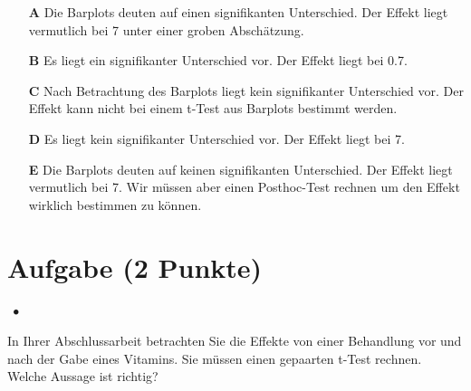 \documentclass[a4paper, 9pt]{scrartcl}\usepackage[]{graphicx}\usepackage[]{xcolor}
\begin{document}
\begin{enumerate}
\item [\textbf{A} \msquare] Die Barplots deuten auf einen signifikanten Unterschied. Der Effekt liegt vermutlich bei 7 unter einer groben Abschätzung.
\item [\textbf{B} \msquare] Es liegt ein signifikanter Unterschied vor. Der Effekt liegt bei 0.7.
\item [\textbf{C} \msquare] Nach Betrachtung des Barplots liegt kein signifikanter Unterschied vor. Der Effekt kann nicht bei einem t-Test aus Barplots bestimmt werden.
\item [\textbf{D} \msquare] Es liegt kein signifikanter Unterschied vor. Der Effekt liegt bei 7.
\item [\textbf{E} \msquare] Die Barplots deuten auf keinen signifikanten Unterschied. Der Effekt liegt vermutlich bei 7. Wir müssen aber einen Posthoc-Test rechnen um den Effekt wirklich bestimmen zu können.
\end{enumerate}

\section{Aufgabe \hfill (2 Punkte)}

\ifcollection
\begin{flushright}
\tiny\vspace{-2Ex}
\textbf{\examinhaltstart}
\exammodulestatversuch $\;\bullet$
\exammodulebiostat
\vspace{-1Ex}
\end{flushright}
\fi





In Ihrer Abschlussarbeit betrachten Sie die Effekte von einer Behandlung vor und nach der Gabe eines Vitamins. Sie müssen einen gepaarten t-Test rechnen. Welche Aussage ist richtig?
\end{document}
